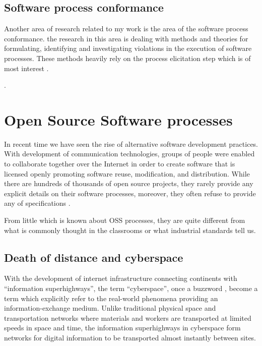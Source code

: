\subsection{Software process conformance}
Another area of research related to my work is the area of the software process conformance. 
the research in this area is dealing with methods and theories for formulating, identifying and
investigating violations in the execution of software processes. These methods heavily rely
on the process elicitation step which is of most interest . 

.

\section{Open Source Software processes}\label{oss.processes}
In recent time we have seen the rise of alternative software development practices. 
With development of communication technologies, groups of people were 
enabled to collaborate together over the Internet in order to create software that is 
licensed openly promoting software reuse, modification, and distribution. While there are 
hundreds of thousands of open source projects, they rarely provide any explicit details on 
their software processes, moreover, they often refuse to provide any of 
specifications \cite{Torvalds:2005}. 

From little which is known about OSS processes, they are quite different from what is 
commonly thought in the classrooms or what industrial standards tell us.

\subsection{Death of distance and cyberspace}
With the development of internet infrastructure connecting continents with ``information
superhighways'', the term ``cyberspace'', once a buzzword \cite{citeulike:11095763}, become 
a term which explicitly refer to the real-world phenomena providing an information-exchange
medium. Unlike traditional physical space and transportation networks where materials
and workers are transported at limited speeds in space and time, the information superhighways
in cyberspace form networks for digital information to be transported almost instantly 
between sites.


